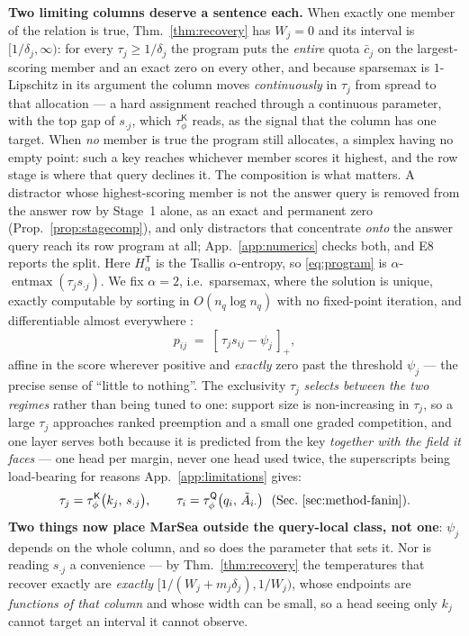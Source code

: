 \documentclass{article}
\newcommand{\entmaxop}{\operatorname{entmax}}
\newcommand{\tauK}{\tau^{\mathsf{K}}_\phi}
\newcommand{\tauQ}{\tau^{\mathsf{Q}}_\phi}
\newcommand{\Tent}{H^{\mathsf{T}}}
\begin{document}
\textbf{Two limiting columns deserve a sentence each.} When exactly one member of the relation
is true, Thm.~\ref{thm:recovery} has $W_j=0$ and its interval is $[1/\delta_j,\infty)$: for every
$\tau_j\ge1/\delta_j$ the program puts the \emph{entire} quota $\bar c_j$ on the largest-scoring
member and an exact zero on every other, and because sparsemax is $1$-Lipschitz in its argument
the column moves \emph{continuously} in $\tau_j$ from spread to that allocation --- a hard
assignment reached through a continuous parameter, with the top gap of $s_{\cdot j}$, which
$\tauK$ reads, as the signal that the column has one target. When \emph{no} member is true the
program still allocates, a simplex having no empty point: such a key reaches whichever member
scores it highest, and the row stage is where that query declines it. The composition is what
matters. A distractor whose highest-scoring member is not the answer query is removed from the
answer row by Stage~1 alone, as an exact and permanent zero (Prop.~\ref{prop:stagecomp}), and
only distractors that concentrate \emph{onto} the answer query reach its row program at all;
App.~\ref{app:numerics} checks both, and E8 reports the split.
Here $\Tent_\alpha$ is the Tsallis $\alpha$-entropy, so \eqref{eq:program} is
$\alpha$-$\entmaxop(\tau_j s_{\cdot j})$. We fix $\alpha=2$, i.e.\ sparsemax, where the solution
is unique, exactly computable by sorting in $O(n_q\log n_q)$ with no fixed-point iteration, and
differentiable almost everywhere \citep{martins2016softmax,peters2019sparse}:
\begin{equation}
p_{ij} \;=\; [\,\tau_j s_{ij} - \psi_j\,]_+ ,
\label{eq:affine}
\end{equation}
affine in the score wherever positive and \emph{exactly} zero past the threshold $\psi_j$ --- the
precise sense of ``little to nothing''. The exclusivity $\tau_j$ \emph{selects between the two
regimes} rather than being tuned to one: support size is non-increasing in $\tau_j$, so a large
$\tau_j$ approaches ranked preemption and a small one graded competition, and one layer serves
both because it is predicted from the key \emph{together with the field it faces} --- one head
per margin, never one head used twice, the superscripts being load-bearing for reasons
App.~\ref{app:limitations} gives:
\begin{equation}
\tau_j = \tauK\big(k_j,\,s_{\cdot j}\big),
\qquad
\tau_i = \tauQ\big(q_i,\,\tilde A_{i\cdot}\big)
\ \ \text{(Sec.~\ref{sec:method-fanin})} .
\label{eq:tauhead}
\end{equation}
\textbf{Two things now place MarSea outside the query-local class, not one}: $\psi_j$ depends on
the whole column, and so does the parameter that sets it. Nor is reading $s_{\cdot j}$ a
convenience --- by Thm.~\ref{thm:recovery} the temperatures that recover exactly are
\emph{exactly} $[1/(W_j+m_j\delta_j),1/W_j)$, whose endpoints are \emph{functions of that
column} and whose width can be small, so a head seeing only $k_j$ cannot target an interval it
cannot observe.
\end{document}
